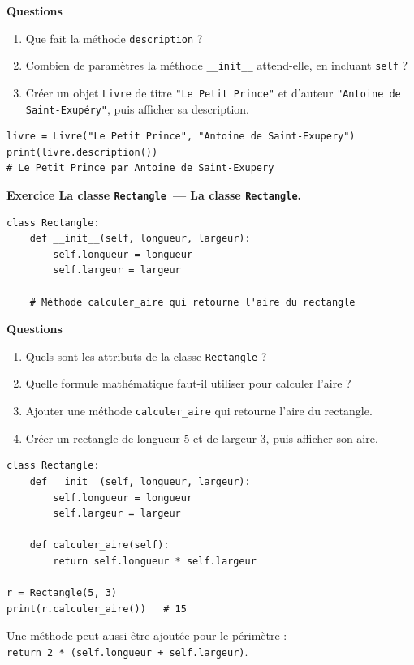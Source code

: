 \documentclass[11pt,a4paper]{article}
\newif\ifcorrige
\newcommand{\py}[1]{\texttt{#1}}
\newcounter{exo}[section]
\renewcommand{\theexo}{\arabic{exo}}
\newcommand{\exo}[2][]{%
  \Needspace{5cm}\stepcounter{exo}%
  \begin{quest}\textbf{Exercice \theexo\ifx\relax#1\relax\else\ — #1\fi.}
  \ifx\relax#2\relax\else\ #2\fi\end{quest}}
\newcommand{\rep}[1]{%
  \ifcorrige
    \par\smallskip{\color{corr}\small#1}\par\smallskip
  \else
    \par\nobreak\vspace{1mm}\noindent\color{black!55}\dotfill\par
    \noindent\color{black!55}\dotfill\par\color{black}\vspace{1mm}
  \fi}
\newcommand{\zonecode}[1][4cm]{%
  \ifcorrige\else
    \par\smallskip\noindent
    \begin{tcolorbox}[colback=white,colframe=black!45,boxrule=0.5pt,arc=1pt,height=#1]\end{tcolorbox}%
  \fi}
\newenvironment{solution}
  {\ifcorrige
     \begin{tcolorbox}[enhanced,breakable,colback=corrbg,colframe=corr,boxrule=0.6pt,arc=1pt,
       left=5pt,right=5pt,top=4pt,bottom=4pt,
       title={Corrigé},coltitle=corr,fonttitle=\bfseries\small,detach title,
       before upper={\tcbtitle\par\smallskip},fontupper=\small]%
   \else
     \setbox0\vbox\bgroup
   \fi}
  {\ifcorrige\end{tcolorbox}\else\egroup\fi}
\begin{document}
\textbf{Questions}
\begin{enumerate}
  \item Que fait la méthode \py{description} ?
    \rep{Elle retourne une chaîne qui associe le titre et l'auteur du livre, sous la forme
    \py{"titre par auteur"}.}
  \item Combien de paramètres la méthode \py{__init__} attend-elle, en incluant \py{self} ?
    \rep{Trois : \py{self}, \py{titre} et \py{auteur}. À l'appel, seuls deux arguments sont
    fournis : \py{self} est transmis automatiquement par Python.}
  \item Créer un objet \py{Livre} de titre \py{"Le Petit Prince"} et d'auteur
    \py{"Antoine de Saint-Exupéry"}, puis afficher sa description.
\end{enumerate}
\zonecode[3cm]
\begin{solution}
\begin{lstlisting}
livre = Livre("Le Petit Prince", "Antoine de Saint-Exupery")
print(livre.description())
# Le Petit Prince par Antoine de Saint-Exupery
\end{lstlisting}
\end{solution}

\exo[La classe \py{Rectangle}]{}

\begin{lstlisting}
class Rectangle:
    def __init__(self, longueur, largeur):
        self.longueur = longueur
        self.largeur = largeur

    # Méthode calculer_aire qui retourne l'aire du rectangle
\end{lstlisting}

\textbf{Questions}
\begin{enumerate}
  \item Quels sont les attributs de la classe \py{Rectangle} ?
    \rep{\py{longueur} et \py{largeur}.}
  \item Quelle formule mathématique faut-il utiliser pour calculer l'aire ?
    \rep{$\text{aire} = \text{longueur} \times \text{largeur}$.}
  \item Ajouter une méthode \py{calculer_aire} qui retourne l'aire du rectangle.
  \item Créer un rectangle de longueur 5 et de largeur 3, puis afficher son aire.
\end{enumerate}
\zonecode[4.5cm]
\begin{solution}
\begin{lstlisting}
class Rectangle:
    def __init__(self, longueur, largeur):
        self.longueur = longueur
        self.largeur = largeur

    def calculer_aire(self):
        return self.longueur * self.largeur

r = Rectangle(5, 3)
print(r.calculer_aire())   # 15
\end{lstlisting}
Une méthode peut aussi être ajoutée pour le périmètre :\\
\py{return 2 * (self.longueur + self.largeur)}.
\end{solution}
\end{document}
